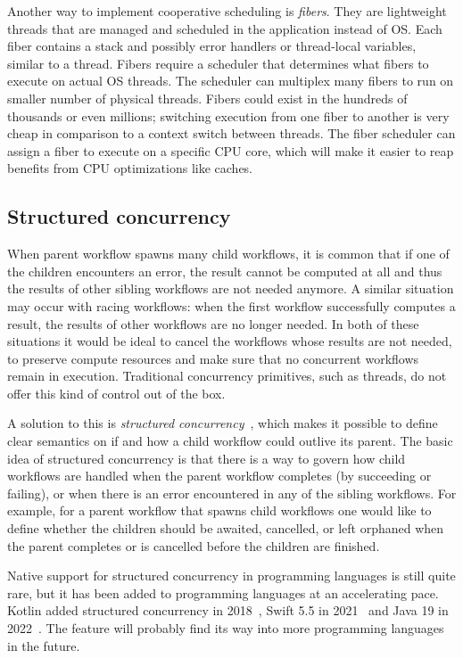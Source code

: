 Another way to implement cooperative scheduling is \textit{fibers}. They are lightweight threads that are managed and scheduled in the application instead of OS. Each fiber contains a stack and possibly error handlers or thread-local variables, similar to a thread. Fibers require a scheduler that determines what fibers to execute on actual OS threads. The scheduler can multiplex many fibers to run on smaller number of physical threads. Fibers could exist in the hundreds of thousands or even millions; switching execution from one fiber to another is very cheap in comparison to a context switch between threads. The fiber scheduler can assign a fiber to execute on a specific CPU core, which will make it easier to reap benefits from CPU optimizations like caches.


\subsection{Structured concurrency}
When parent workflow spawns many child workflows, it is common that if one of the children encounters an error, the result cannot be computed at all and thus the results of other sibling workflows are not needed anymore. A similar situation may occur with racing workflows: when the first workflow successfully computes a result, the results of other workflows are no longer needed. In both of these situations it would be ideal to cancel the workflows whose results are not needed, to preserve compute resources and make sure that no concurrent workflows remain in execution. Traditional concurrency primitives, such as threads, do not offer this kind of control out of the box.

A solution to this is \textit{structured concurrency}~\cite{structured-concurrency, go-statement-considered-harmful}, which makes it possible to define clear semantics on if and how a child workflow could outlive its parent. The basic idea of structured concurrency is that there is a way to govern how child workflows are handled when the parent workflow completes (by succeeding or failing), or when there is an error encountered in any of the sibling workflows. For example, for a parent workflow that spawns child workflows one would like to define whether the children should be awaited, cancelled, or left orphaned when the parent completes or is cancelled before the children are finished.

Native support for structured concurrency in programming languages is still quite rare, but it has been added to programming languages at an accelerating pace. Kotlin added structured concurrency in 2018~\cite{kotlin-sc}, Swift 5.5 in 2021~\cite{swift-sc} and Java 19 in 2022~\cite{java-sc}. The feature will probably find its way into more programming languages in the future.

